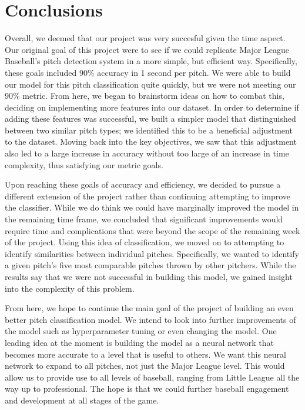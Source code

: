 \documentclass{article}
\begin{document}
\section{Conclusions}
\label{conclusion}

Overall, we deemed that our project was very succesful given the time aspect. Our original goal of this 
project were to see if we could replicate Major League Baseball's pitch detection system in a more simple,
but efficient way. Specifically, these goals included $90\%$ accuracy in 1 second per pitch. We were able to 
build our model for this pitch classification quite quickly, but we were not meeting our $90\%$ metric. 
From here, we began to brainstorm ideas on how to combat this, deciding on implementing more features 
into our dataset. In order to determine if adding these features was successful, we built a simpler model 
that distinguished between two similar pitch types; we identified this to be a beneficial adjustment 
to the dataset. Moving back into the key objectives, we saw that this adjustment also led to a large 
increase in accuracy without too large of an increase in time complexity, thus satisfying our metric 
goals. 

Upon reaching these goals of accuracy and efficiency, we decided to pursue a different extension of the 
project rather than continuing attempting to improve the classifier. While we do think we could have 
marginally improved the model in the remaining time frame, we concluded that significant improvements 
would require time and complications that were beyond the scope of the remaining week of the project. 
Using this idea of classification, we moved on to attempting to identify similarities between individual 
pitches. Specifically, we wanted to identify a given pitch's five most comparable pitches thrown by 
other pitchers. While the results say that we were not successful in building this model, we gained insight 
into the complexity of this problem. 

From here, we hope to continue the main goal of the project of building an even better 
pitch classification model. We intend to look into further improvements of the model such 
as hyperparameter tuning or even changing the model. One leading idea at the moment is 
building the model as a neural network that becomes more accurate to a level that is 
useful to others. We want this neural network to expand to all pitches, not just the Major 
League level. This would allow us to provide use to all levels of baseball, ranging from 
Little League all the way up to professional. The hope is that we could further baseball 
engagement and development at all stages of the game.
\end{document}

